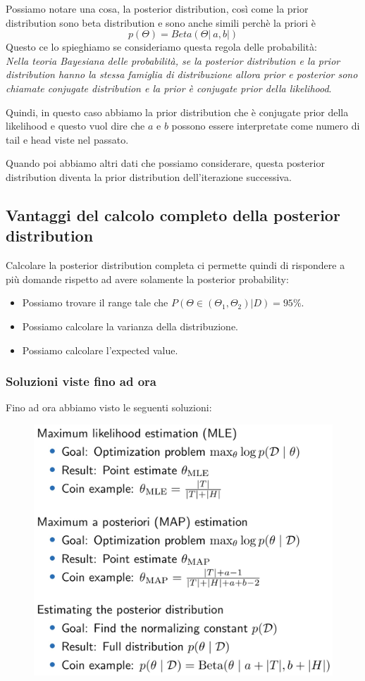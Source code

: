 \documentclass[14pt]{extreport}
\begin{document}
Possiamo notare una cosa, la posterior distribution, così come la prior distribution sono beta distribution e sono anche simili perchè la priori è
$$p(\Theta) = Beta(\Theta|\ a, b|)$$ Questo ce lo spieghiamo se consideriamo questa regola delle probabilità:\\
\textit{Nella teoria Bayesiana delle probabilità, se la posterior distribution e la prior distribution hanno la stessa famiglia di distribuzione
	allora prior e posterior sono chiamate conjugate distribution e la prior è conjugate prior della likelihood}.

Quindi, in questo caso abbiamo la prior distribution che è conjugate prior della likelihood e questo vuol dire che $a$ e $b$ possono essere
interpretate come numero di tail e head viste nel passato.

Quando poi abbiamo altri dati che possiamo considerare, questa posterior distribution diventa la prior distribution dell'iterazione successiva.

\subsection{Vantaggi del calcolo completo della posterior distribution}

Calcolare la posterior distribution completa ci permette quindi di rispondere a più domande rispetto ad avere solamente la posterior probability:
\begin{itemize}
	\item Possiamo trovare il range tale che $P(\Theta \in (\Theta_1,\Theta_2)|D) = 95\%$.
	\item Possiamo calcolare la varianza della distribuzione.
	\item Possiamo calcolare l'expected value.
\end{itemize}

\subsubsection{Soluzioni viste fino ad ora}

Fino ad ora abbiamo visto le seguenti soluzioni:
\begin{figure}[H]
	\centering
	\includegraphics[width=0.5\linewidth]{46.jpeg}
\end{figure}
\end{document}
